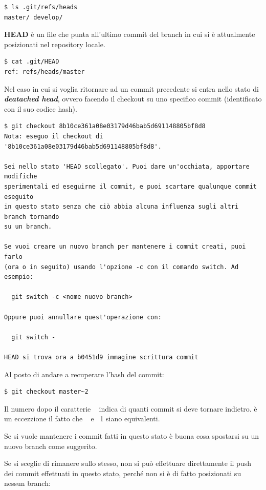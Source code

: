 \documentclass{article}
\begin{document}
\begin{verbatim}
$ ls .git/refs/heads
master/ develop/
\end{verbatim}

\textbf{HEAD} è un file che punta all'ultimo commit del branch in cui si è
attualmente posizionati nel repository locale.

\begin{verbatim}
$ cat .git/HEAD
ref: refs/heads/master
\end{verbatim}

Nel caso in cui si voglia ritornare ad un commit precedente si entra nello stato
di \emph{\textbf{deatached head}}, ovvero facendo il checkout su uno specifico
commit (identificato con il suo codice hash).

\begin{verbatim}
$ git checkout 8b10ce361a08e03179d46bab5d691148805bf8d8
Nota: eseguo il checkout di '8b10ce361a08e03179d46bab5d691148805bf8d8'.

Sei nello stato 'HEAD scollegato'. Puoi dare un'occhiata, apportare modifiche
sperimentali ed eseguirne il commit, e puoi scartare qualunque commit eseguito
in questo stato senza che ciò abbia alcuna influenza sugli altri branch tornando
su un branch.

Se vuoi creare un nuovo branch per mantenere i commit creati, puoi farlo
(ora o in seguito) usando l'opzione -c con il comando switch. Ad esempio:

  git switch -c <nome nuovo branch>

Oppure puoi annullare quest'operazione con:

  git switch -

HEAD si trova ora a b0451d9 immagine scrittura commit
\end{verbatim}

Al posto di andare a recuperare l'hash del commit:

\begin{verbatim}
$ git checkout master~2
\end{verbatim}

Il numero dopo il caratterie ~ indica di quanti commit si deve tornare indietro.
è un eccezzione il fatto che ~ e ~1 siano equivalenti.

Se si vuole mantenere i commit fatti in questo stato è buona cosa spostarsi su
un nuovo branch come suggerito.

Se si sceglie di rimanere sullo stesso, non si può effettuare direttamente il push dei
commit effettuati in questo stato, perché non si è di fatto posizionati su nessun branch:
\end{document}
